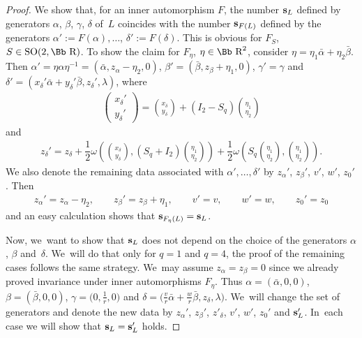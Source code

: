 \documentclass[10pt,a4paper]{amsart}
\newcommand\RR{{\mbox{\Bb R}}}
\newcommand\bs{\textbf{{\rm \textbf{s}}}}
\newcommand{\SO}{\mathop{{\rm SO}}}
\numberwithin{equation}{section}
\begin{document}
\begin{proof}
We show that, for an inner automorphism $F$, the number $\bs_L$ defined by generators $\alpha$, $\beta$, $\gamma$, $\delta$ of~$L$ coincides with the number $\bs_{F(L)}$ defined by the generators $\alpha':=F(\alpha),\dots$, \mbox{$\delta':=F(\delta)$}. This is obvious for $F_S$, $S\in\SO(2,\RR)$.
To show the claim for $F_\eta$, $\eta\in\RR^2$, consider $\eta=\eta_1\bar\alpha+\eta_2\bar\beta$.
Then $\alpha'=\eta\alpha\eta^{-1}=(\bar\alpha,z_\alpha-\eta_2,0)$, $\beta'=(\bar\beta,z_\beta+\eta_1,0)$,
$\gamma'=\gamma$ and $\delta'=(x_\delta'\bar \alpha+y_\delta'\bar \beta,z_\delta',\lambda)$, where
\begin{gather*}
\begin{pmatrix}x_\delta'\\y_\delta'\end{pmatrix}
= {x_\delta \choose y_\delta} +(I_2-S_q){\eta_1 \choose \eta_2}\end{gather*}
and
\begin{gather*}
z_\delta'=z_\delta+\dfrac{1}{2}\omega\left(\!{x_\delta\choose y_\delta},
(S_q+I_2){\eta_1\choose \eta_2}\!\right)
+\dfrac{1}{2}\omega\left( S_q{\eta_1\choose \eta_2}, {\eta_1\choose \eta_2}\! \right)\!.
\end{gather*}
We also denote the remaining data associated with $\alpha',\dots,\delta'$ by $z_\alpha'$, $z_\beta'$, $v'$, $w'$, $z_0'$. Then
\begin{gather*}
z_\alpha'=z_\alpha-\eta_2,\qquad
z_\beta'=z_\beta+\eta_1,\qquad
v'=v,\qquad w'=w,\qquad z_0'=z_0
\end{gather*}
and an easy calculation shows that $\bs_{F_\eta(L)}=\bs_L$.

Now, we~want to show that $\bs_L$ does not depend on the choice of the generators $\alpha$, $\beta$ and~$\delta$. We~will do that only for $q=1$ and $q=4$, the proof of the remaining cases follows the same strategy. We~may assume $z_\alpha=z_\beta=0$ since we already proved invariance under inner automorphisms $F_\eta$. Thus $\alpha=(\bar\alpha,0,0)$, $\beta=(\bar\beta,0,0)$, $\gamma=\big(0,\frac{1}{r},0\big)$ and $\delta=\big(\frac{v}{r}\bar\alpha+\frac{w}{r}\bar\beta,z_\delta,\lambda\big)$. We~will change the set of generators and denote the new data by $z_\alpha'$, $z_\beta'$, $z'_\delta$, $v'$, $w'$, $z_0'$ and $\bs_L'$. In~each case we will show that $\bs_L=\bs_L'$ holds.


\end{proof}
\end{document}
